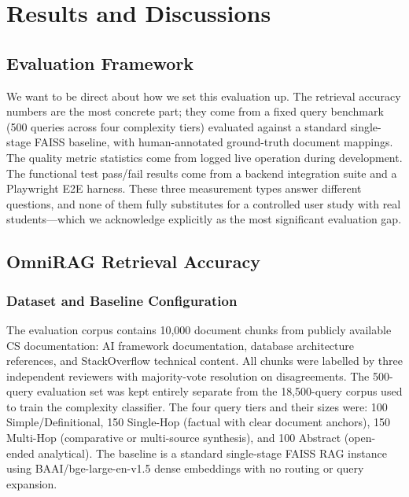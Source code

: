 \chapter{Results and Discussions}
\label{chap:results}

\section{Evaluation Framework}
\label{sec:eval-approach}

We want to be direct about how we set this evaluation up. The retrieval
accuracy numbers are the most concrete part; they come from a fixed query
benchmark (500 queries across four complexity tiers) evaluated against a
standard single-stage FAISS baseline, with human-annotated ground-truth
document mappings. The quality metric statistics come from logged live
operation during development. The functional test pass/fail results come
from a backend integration suite and a Playwright E2E harness. These three
measurement types answer different questions, and none of them fully
substitutes for a controlled user study with real students---which we
acknowledge explicitly as the most significant evaluation gap.

\section{OmniRAG Retrieval Accuracy}
\label{sec:retrieval-results}

\subsection{Dataset and Baseline Configuration}

The evaluation corpus contains 10,000 document chunks from publicly
available CS documentation: AI framework documentation, database
architecture references, and StackOverflow technical content. All chunks
were labelled by three independent reviewers with majority-vote resolution
on disagreements. The 500-query evaluation set was kept entirely separate
from the 18,500-query corpus used to train the complexity classifier. The
four query tiers and their sizes were: 100 Simple/Definitional, 150
Single-Hop (factual with clear document anchors), 150 Multi-Hop
(comparative or multi-source synthesis), and 100 Abstract (open-ended
analytical). The baseline is a standard single-stage FAISS RAG instance
using BAAI/bge-large-en-v1.5 dense embeddings with no routing or query
expansion.

